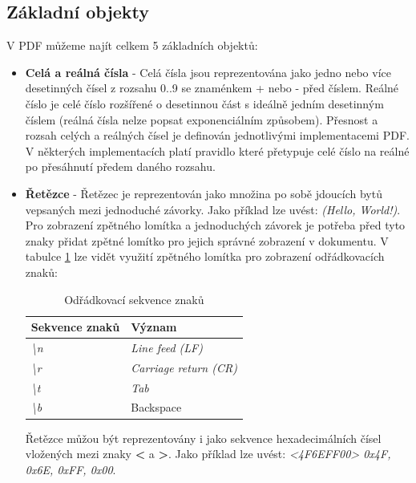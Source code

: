 \subsection{Základní objekty}
V PDF můžeme najít celkem 5 základních objektů:
	\begin{itemize}
		\item \textbf{Celá a reálná čísla} - Celá čísla jsou reprezentována jako jedno nebo více desetinných čísel z rozsahu 0..9 se znaménkem + nebo - před číslem. Reálné číslo je celé číslo rozšířené o desetinnou část s ideálně jedním desetinným číslem (reálná čísla nelze popsat exponenciálním způsobem). Přesnost a rozsah celých a reálných čísel je definován jednotlivými implementacemi PDF. V některých implementacích platí pravidlo které přetypuje celé číslo na reálné po přesáhnutí předem daného rozsahu.
		\item \textbf{Řetězce} - Řetězec je reprezentován jako množina po sobě jdoucích bytů vepsaných mezi jednoduché závorky. Jako příklad lze uvést: \textit{(Hello, World!)}. Pro zobrazení zpětného lomítka a jednoduchých závorek je potřeba před tyto znaky přidat zpětné lomítko pro jejich správné zobrazení v dokumentu. V tabulce \ref{fig:table_escaped} lze vidět využití zpětného lomítka pro zobrazení odřádkovacích znaků:
			\begin{table}[h!]
			\centering
			\begin{tabular}{|l|l|} 
			\hline
			\textbf{Sekvence znaků}    & \textbf{Význam}                \\ 
			\hline
			\textit{\textbackslash{}n} & \textit{Line feed (LF)}        \\ 
			\hline
			\textit{\textbackslash{}r} & \textit{Carriage return (CR)}  \\ 
			\hline
			\textit{\textbackslash{}t} & \textit{Tab}                   \\ 
			\hline
			\textit{\textbackslash{}b} & Backspace                      \\
			\hline
			\end{tabular}
			\caption{Odřádkovací sekvence znaků}
			\label{fig:table_escaped}
			\end{table}
		\newline Řetězce můžou být reprezentovány i jako sekvence hexadecimálních čísel vložených mezi znaky \textbf{<} a \textbf{>}. 
		\newline Jako příklad lze uvést: \textit{<4F6EFF00> \textrightarrow 0x4F, 0x6E, 0xFF, 0x00}.


\end{itemize}
